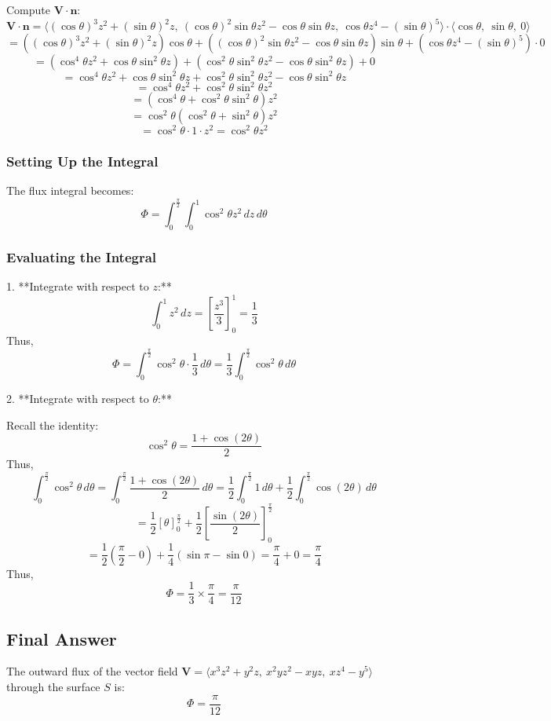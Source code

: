 \documentclass[11pt]{article}
\begin{document}
Compute \( \mathbf{V} \cdot \mathbf{n} \):
\[
\mathbf{V} \cdot \mathbf{n} = \langle (\cos\theta)^3 z^2 + (\sin\theta)^2 z, \ (\cos\theta)^2 \sin\theta z^2 - \cos\theta \sin\theta z, \ \cos\theta z^4 - (\sin\theta)^5 \rangle \cdot \langle \cos\theta, \ \sin\theta, \ 0 \rangle
\]
\[
= \left( (\cos\theta)^3 z^2 + (\sin\theta)^2 z \right) \cos\theta + \left( (\cos\theta)^2 \sin\theta z^2 - \cos\theta \sin\theta z \right) \sin\theta + \left( \cos\theta z^4 - (\sin\theta)^5 \right) \cdot 0
\]
\[
= (\cos^4\theta z^2 + \cos\theta \sin^2\theta z) + (\cos^2\theta \sin^2\theta z^2 - \cos\theta \sin^2\theta z) + 0
\]
\[
= \cos^4\theta z^2 + \cos\theta \sin^2\theta z + \cos^2\theta \sin^2\theta z^2 - \cos\theta \sin^2\theta z
\]
\[
= \cos^4\theta z^2 + \cos^2\theta \sin^2\theta z^2
\]
\[
= (\cos^4\theta + \cos^2\theta \sin^2\theta) z^2
\]
\[
= \cos^2\theta (\cos^2\theta + \sin^2\theta) z^2
\]
\[
= \cos^2\theta \cdot 1 \cdot z^2 = \cos^2\theta z^2
\]

\subsubsection*{Setting Up the Integral}

The flux integral becomes:
\[
\Phi = \int_{0}^{\frac{\pi}{2}} \int_{0}^{1} \cos^2\theta z^2 \, dz \, d\theta
\]

\subsubsection*{Evaluating the Integral}

1. **Integrate with respect to \( z \):**
\[
\int_{0}^{1} z^2 \, dz = \left[ \frac{z^3}{3} \right]_{0}^{1} = \frac{1}{3}
\]
Thus,
\[
\Phi = \int_{0}^{\frac{\pi}{2}} \cos^2\theta \cdot \frac{1}{3} \, d\theta = \frac{1}{3} \int_{0}^{\frac{\pi}{2}} \cos^2\theta \, d\theta
\]

2. **Integrate with respect to \( \theta \):**

Recall the identity:
\[
\cos^2\theta = \frac{1 + \cos(2\theta)}{2}
\]
Thus,
\[
\int_{0}^{\frac{\pi}{2}} \cos^2\theta \, d\theta = \int_{0}^{\frac{\pi}{2}} \frac{1 + \cos(2\theta)}{2} \, d\theta = \frac{1}{2} \int_{0}^{\frac{\pi}{2}} 1 \, d\theta + \frac{1}{2} \int_{0}^{\frac{\pi}{2}} \cos(2\theta) \, d\theta
\]
\[
= \frac{1}{2} \left[ \theta \right]_{0}^{\frac{\pi}{2}} + \frac{1}{2} \left[ \frac{\sin(2\theta)}{2} \right]_{0}^{\frac{\pi}{2}}
\]
\[
= \frac{1}{2} \left( \frac{\pi}{2} - 0 \right ) + \frac{1}{4} \left( \sin\pi - \sin0 \right ) = \frac{\pi}{4} + 0 = \frac{\pi}{4}
\]
Thus,
\[
\Phi = \frac{1}{3} \times \frac{\pi}{4} = \frac{\pi}{12}
\]

\newpage

\subsection{Final Answer}

The outward flux of the vector field \( \mathbf{V} = \langle x^3 z^2 + y^2 z, \ x^2 y z^2 - x y z, \ x z^4 - y^5 \rangle \) through the surface \( S \) is:
\[
\boxed{ \Phi = \frac{\pi}{12} }
\]
\end{document}
